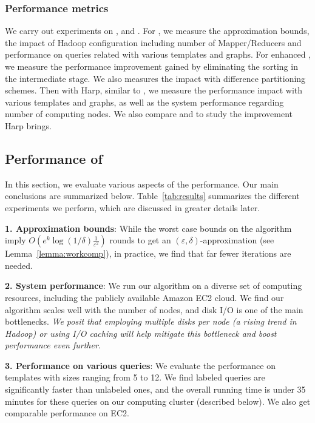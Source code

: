 \subsubsection{Performance metrics}
We carry out experiments on \sahad{}, \ensahad{} and
\harpsahad{}. For \sahad{}, we measure the approximation bounds, the impact of
Hadoop configuration including number of Mapper/Reducers and performance on
queries related with various templates and graphs. For enhanced \sahad{},
we measure the performance improvement gained by eliminating the sorting in the
intermediate stage. We also measures the impact with difference partitioning
schemes. Then with Harp, similar to \sahad{}, we measure the performance
impact with various templates and graphs, as well as the system performance
regarding number of computing nodes. We also compare \harpsahad{} and \sahad{} to
study the improvement Harp brings. 

\subsection{Performance of \sahad{}}
In this section, we evaluate various aspects of the performance.  Our main
conclusions are summarized below. Table~\ref{tab:results} summarizes the
different experiments we perform, which are discussed in greater details later.

\smallskip
\textbf{1. Approximation bounds}: While the worst case bounds on the algorithm
imply $O(e^k\log{(1/\delta)}\frac{1}{\varepsilon^2})$ rounds to get an
$(\varepsilon,\delta)$-approximation (see Lemma~\ref{lemma:workcomp}), in
practice, we find that far fewer iterations are needed.

\smallskip
\textbf{2. System performance}: We run our algorithm on a diverse set of
computing resources, including the publicly available Amazon EC2 cloud. We find
our algorithm scales well with the number of nodes, and disk I/O is one of the
main bottlenecks.  \emph{We posit that employing multiple disks per node (a
rising trend in Hadoop) or using I/O caching will help mitigate this bottleneck
and boost performance even further.}

\smallskip
\textbf{3. Performance on various queries}: We evaluate the performance on
templates with sizes ranging from 5 to 12. We find labeled queries are
significantly faster than unlabeled ones, and the overall running time is under
35 minutes for these queries on our computing cluster (described below). We also
get comparable performance on EC2.

